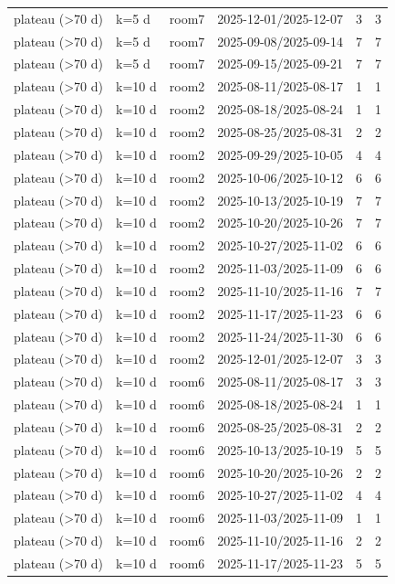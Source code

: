 \begin{tabular}{llllll}
plateau (>70 d) & k=5 d & room7 & 2025-12-01/2025-12-07 & 3 & 3 \\
plateau (>70 d) & k=5 d & room7 & 2025-09-08/2025-09-14 & 7 & 7 \\
plateau (>70 d) & k=5 d & room7 & 2025-09-15/2025-09-21 & 7 & 7 \\
plateau (>70 d) & k=10 d & room2 & 2025-08-11/2025-08-17 & 1 & 1 \\
plateau (>70 d) & k=10 d & room2 & 2025-08-18/2025-08-24 & 1 & 1 \\
plateau (>70 d) & k=10 d & room2 & 2025-08-25/2025-08-31 & 2 & 2 \\
plateau (>70 d) & k=10 d & room2 & 2025-09-29/2025-10-05 & 4 & 4 \\
plateau (>70 d) & k=10 d & room2 & 2025-10-06/2025-10-12 & 6 & 6 \\
plateau (>70 d) & k=10 d & room2 & 2025-10-13/2025-10-19 & 7 & 7 \\
plateau (>70 d) & k=10 d & room2 & 2025-10-20/2025-10-26 & 7 & 7 \\
plateau (>70 d) & k=10 d & room2 & 2025-10-27/2025-11-02 & 6 & 6 \\
plateau (>70 d) & k=10 d & room2 & 2025-11-03/2025-11-09 & 6 & 6 \\
plateau (>70 d) & k=10 d & room2 & 2025-11-10/2025-11-16 & 7 & 7 \\
plateau (>70 d) & k=10 d & room2 & 2025-11-17/2025-11-23 & 6 & 6 \\
plateau (>70 d) & k=10 d & room2 & 2025-11-24/2025-11-30 & 6 & 6 \\
plateau (>70 d) & k=10 d & room2 & 2025-12-01/2025-12-07 & 3 & 3 \\
plateau (>70 d) & k=10 d & room6 & 2025-08-11/2025-08-17 & 3 & 3 \\
plateau (>70 d) & k=10 d & room6 & 2025-08-18/2025-08-24 & 1 & 1 \\
plateau (>70 d) & k=10 d & room6 & 2025-08-25/2025-08-31 & 2 & 2 \\
plateau (>70 d) & k=10 d & room6 & 2025-10-13/2025-10-19 & 5 & 5 \\
plateau (>70 d) & k=10 d & room6 & 2025-10-20/2025-10-26 & 2 & 2 \\
plateau (>70 d) & k=10 d & room6 & 2025-10-27/2025-11-02 & 4 & 4 \\
plateau (>70 d) & k=10 d & room6 & 2025-11-03/2025-11-09 & 1 & 1 \\
plateau (>70 d) & k=10 d & room6 & 2025-11-10/2025-11-16 & 2 & 2 \\
plateau (>70 d) & k=10 d & room6 & 2025-11-17/2025-11-23 & 5 & 5 \\

\end{tabular}
